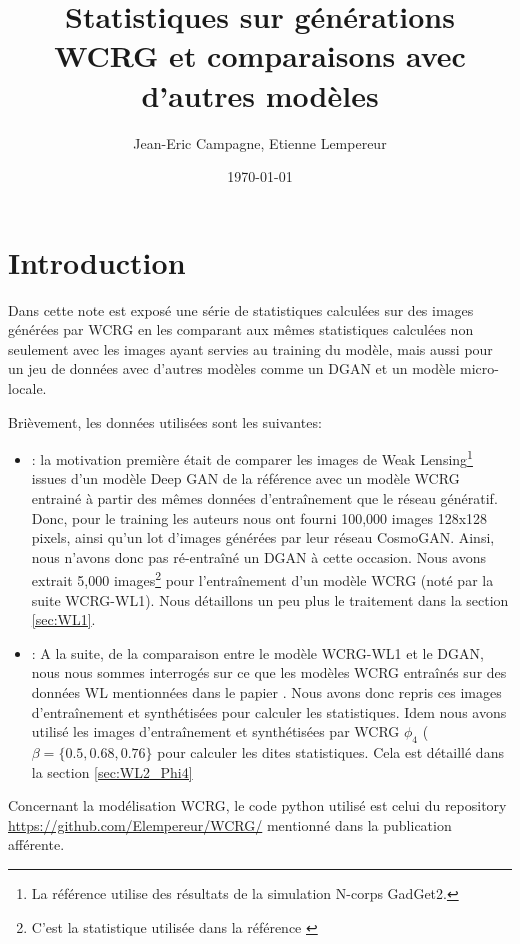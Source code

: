 \documentclass[12pt,twoside]{article}
\title{Statistiques sur générations WCRG et comparaisons avec d'autres modèles}
\author{Jean-Eric Campagne, Etienne Lempereur}
\date{\today}
\begin{document}
\maketitle
\renewcommand{\baselinestretch}{0.75}\normalsize
\tableofcontents
\renewcommand{\baselinestretch}{1.0}\normalsize

\section{Introduction}
Dans cette note est exposé une série de statistiques calculées sur des images générées par WCRG \citep{2023arXiv230600181G} en les comparant aux mêmes statistiques calculées non seulement avec les images ayant servies au training du modèle, mais aussi pour un jeu de données avec d'autres modèles comme un DGAN et un modèle micro-locale.

Brièvement, les données utilisées sont les suivantes: 
\begin{itemize}
\item[WL-1]: la motivation première était de comparer les images de Weak Lensing\footnote{La référence utilise des résultats de la simulation N-corps GadGet2.} issues d'un modèle Deep GAN de la référence \citep{2019ComAC...6....1M} avec un modèle WCRG entrainé à partir des mêmes données d'entraînement que le réseau génératif. Donc, pour le training les auteurs nous ont fourni 100,000 images 128x128 pixels, ainsi qu'un lot d'images générées par leur réseau CosmoGAN. Ainsi, nous n'avons donc pas ré-entraîné un DGAN à cette occasion. Nous avons extrait 5,000 images\footnote{C'est la statistique utilisée dans la référence \citep{2023arXiv230600181G}} pour l'entraînement d'un modèle WCRG (noté par la suite WCRG-WL1). Nous détaillons un peu plus le traitement dans la section \ref{sec:WL1}.
\item[WL-2 \& $\phi_4$]:  A la suite, de la comparaison entre le modèle WCRG-WL1 et le DGAN, nous nous sommes interrogés sur ce que les modèles WCRG entraînés sur des données WL mentionnées dans le papier \citep{2023arXiv230600181G}. Nous avons donc repris ces images d'entraînement et synthétisées pour calculer les statistiques. Idem nous avons utilisé les images d'entraînement et synthétisées par WCRG $\phi_4$ ($\beta=\{0.5, 0.68, 0.76\}$ pour calculer les dites statistiques. Cela est détaillé dans la section \ref{sec:WL2_Phi4}
\end{itemize}

Concernant la modélisation WCRG, le code python utilisé est celui du repository \url{https://github.com/Elempereur/WCRG/} mentionné dans la publication afférente.
\end{document}
